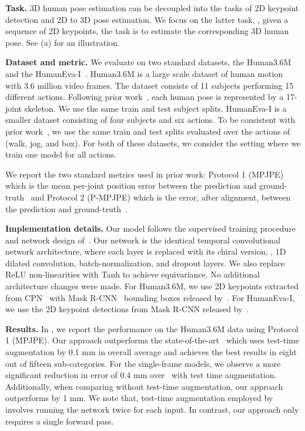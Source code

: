 \documentclass{article}
\begin{document}
\textbf{Task.} 3D human pose estimation can be decoupled into the tasks of 2D keypoint detection and 2D to 3D pose estimation. We focus on the latter task, \ie, given a sequence of 2D keypoints, the task is to estimate the corresponding 3D human pose. See  (a) for an illustration. 

\textbf{Dataset and metric.}
We evaluate on two standard datasets, the Human3.6M~\cite{h36m_pami} and the HumanEva-I~\cite{sigal2010humaneva}. 
Human3.6M is a large scale dataset of human motion with 3.6 million video frames. The dataset consists of 11 subjects performing 15 different actions. Following prior work~\cite{pavlakos17volumetric, tekin2017learning, martinez2017simple, sun2017compositional, luvizon20182d, pavllo20193d}, each human pose is represented by a 17-joint skeleton. We use the same train and test subject splits. HumanEva-I is a smaller  dataset consisting of four subjects and six actions. To be consistent with prior work~\cite{pavlakos2018ordinal, lee2018propagating, pavllo20193d}, we use the same train and test splits evaluated over the actions of (walk, jog, and box). For both of these datasets, we consider the setting where we train one model for all actions. 

We report the two standard metrics used in prior work: Protocol 1 (MPJPE) which is the mean per-joint position error between the prediction and ground-truth~\cite{martinez2017simple, pavlakos17volumetric, pavllo20193d}  and Protocol 2 (P-MPJPE) which is the error, after alignment, between the prediction and ground-truth~\cite{martinez2017simple, sun2017compositional, hossain2018exploiting, pavllo20193d}. 



\textbf{Implementation details.} Our model follows the supervised training procedure and network design of~\citet{pavllo20193d}. Our network is the identical temporal convolutional network architecture, where each layer is replaced with its
chiral version, \ie, 1D dilated convolution, batch-normalization, and dropout layers. We also replace ReLU non-linearities with Tanh to achieve equivariance. No additional architecture changes were made. For Human3.6M, we use 2D keypoints extracted from CPN~\cite{chen2018cascaded} with Mask R-CNN~\cite{he2017mask} bounding boxes released by~\citet{pavllo20193d}. For HumanEva-I, we use the 2D keypoint detections from Mask R-CNN released by~\citet{pavllo20193d}. 

\textbf{Results.}
In , we report the performance on the Human3.6M data using Protocol 1 (MPJPE). Our approach outperforms the state-of-the-art~\cite{pavllo20193d} which uses test-time augmentation by 0.1 mm in overall average and achieves the best results in eight out of fifteen sub-categories. For the single-frame models, we observe a more significant reduction in error of 0.4 mm over~\cite{pavllo20193d} with test time augmentation. 
Additionally, when comparing without  test-time augmentation, our approach outperforms by 1 mm. 
We note that,  test-time augmentation employed by \citet{pavllo20193d} involves running the network twice for each input. In contrast, our approach only requires a single forward pass.
\end{document}
